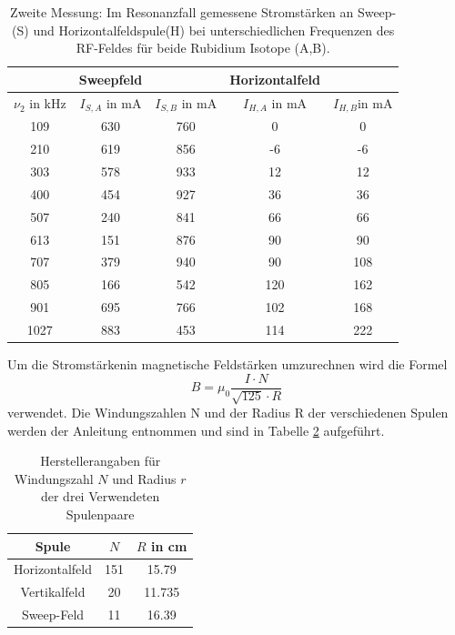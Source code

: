 \begin{table}[H]
  \centering
  \caption{Zweite Messung: Im Resonanzfall gemessene Stromstärken an Sweep-(S) und Horizontalfeldspule(H) bei unterschiedlichen Frequenzen des RF-Feldes für beide Rubidium Isotope (A,B).}
  \label{tab:Messwerte2}
  \begin{tabular}{c|cc|cc}
  & Sweepfeld & & Horizontalfeld &\\
  \hline
  $\nu_2$ in kHz& $I_{S,A}$ in $\si{\milli\ampere}$& $I_{S,B}$ in \si{\milli\ampere}&$I_{H,A}$ in \si{\milli\ampere}& $I_{H,B}$in \si{\milli\ampere}\\
  \hline
  109 &630 &760  &0   &0   \\
  210 &619 &856  &-6  &-6  \\
  303 &578 &933 &12  &12  \\
  400 &454 &927 &36  &36  \\
  507 &240 &841  &66  &66  \\
  613 &151 &876  &90  &90  \\
  707 &379 &940 &90  &108 \\
  805 &166 &542  &120 &162 \\
  901 &695 &766  &102 &168 \\
  1027&883 &453  &114 &222 \\
  \hline
  \end{tabular}
\end{table}
 Um die Stromstärkenin magnetische Feldstärken umzurechnen wird die Formel
\begin{equation}
  B = \mu_0\frac{ I \cdot N}{\sqrt{125}\cdot R}
  \label{eqn:Spulenbfeld}
\end{equation}
verwendet. Die Windungszahlen N und der Radius R der verschiedenen Spulen werden der Anleitung\cite{Anleitung} entnommen und sind in Tabelle \ref{tab:Spulendaten} aufgeführt.
\begin{table}[H]
  \centering
  \caption{Herstellerangaben für Windungszahl $N$ und Radius $r$ der drei Verwendeten Spulenpaare}
  \label{tab:Spulendaten}
  \begin{tabular}{c|c|c}
    Spule & $N$ &$R$ in cm\\
    \hline
    Horizontalfeld& 151 & 15.79\\
    Vertikalfeld  & 20  & 11.735\\
    Sweep-Feld    & 11  & 16.39\\
  \end{tabular}
\end{table}
